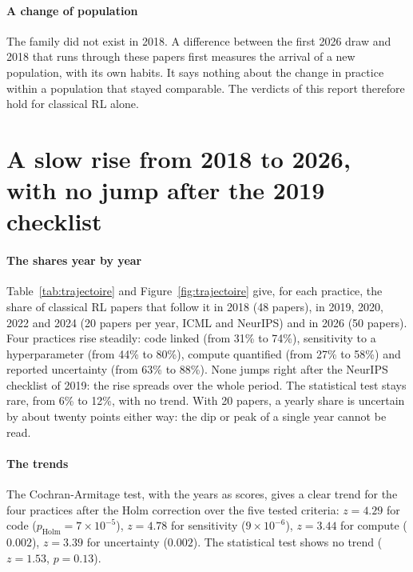 
\paragraph{A change of population}
The  family did not exist in 2018. A difference between the first 2026 draw and 2018 that runs
through these papers first measures the arrival of a new population, with its own habits. It says
nothing about the change in practice within a population that stayed comparable. The verdicts of this
report therefore hold for classical RL alone.

\section{A slow rise from 2018 to 2026, with no jump after the 2019 checklist}\label{sec:sr-trajectoire}

\paragraph{The shares year by year}
Table~\ref{tab:trajectoire} and Figure~\ref{fig:trajectoire} give, for each practice, the share of
classical RL papers that follow it in 2018 (48 papers), in 2019, 2020, 2022 and 2024 (20 papers per
year, ICML and NeurIPS) and in 2026 (50 papers). Four practices rise steadily: code linked (from 31\% to
74\%), sensitivity to a hyperparameter (from 44\% to 80\%), compute quantified (from 27\% to 58\%) and
reported uncertainty (from 63\% to 88\%). None jumps right after the NeurIPS checklist of 2019: the rise
spreads over the whole period. The statistical test stays rare, from 6\% to 12\%, with no trend. With 20
papers, a yearly share is uncertain by about twenty points either way: the dip or peak of a single year
cannot be read.



\paragraph{The trends}
The Cochran-Armitage test, with the years as scores, gives a clear trend for the four practices after
the Holm correction over the five tested criteria: $z = 4.29$ for code
($p_{\text{Holm}} = 7 \times 10^{-5}$), $z = 4.78$ for sensitivity ($9 \times 10^{-6}$), $z = 3.44$ for
compute ($0.002$), $z = 3.39$ for uncertainty ($0.002$). The statistical test shows no trend
($z = 1.53$, $p = 0.13$).

